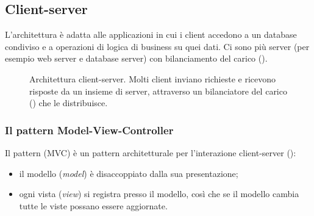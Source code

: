 \subsection{Client-server}

L'architettura  è adatta alle applicazioni in cui i client accedono a un database condiviso e a
operazioni di logica di business su quei dati. Ci sono più server (per esempio web server e database server) con
bilanciamento del carico ().

\begin{figure}[ht]
\centering
{}
\caption{Architettura client-server. Molti client inviano richieste e ricevono risposte da un insieme di server,
attraverso un bilanciatore del carico () che le distribuisce.}
\label{fig:arch-clientserver}
\end{figure}

\subsubsection{Il pattern Model-View-Controller}
Il pattern  (MVC) è un pattern architetturale per l'interazione client-server
():
\begin{itemize}
  \item il modello (\emph{model}) è disaccoppiato dalla sua presentazione;
  \item ogni vista (\emph{view}) si registra presso il modello, così che se il modello cambia tutte le viste possano
    essere aggiornate.
\end{itemize}

